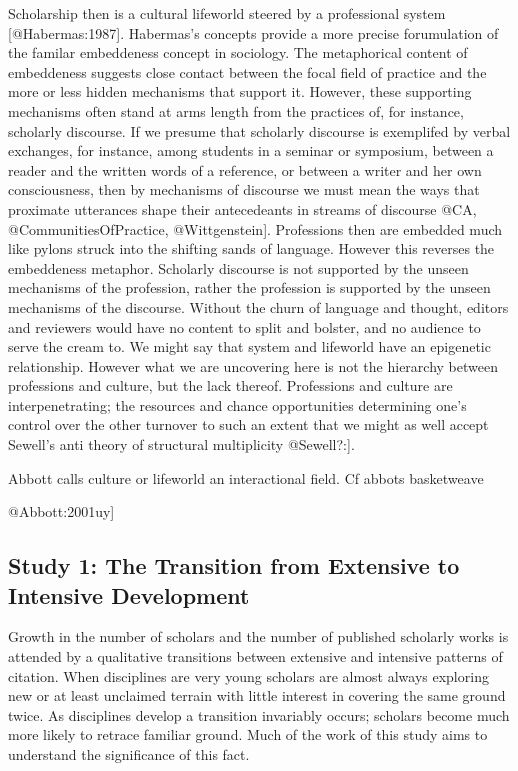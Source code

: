 \documentclass[]{article}
\begin{document}
Scholarship then is a cultural lifeworld steered by a professional
system {[}@Habermas:1987{]}. Habermas's concepts provide a more precise
forumulation of the familar embeddeness concept in sociology. The
metaphorical content of embeddeness suggests close contact between the
focal field of practice and the more or less hidden mechanisms that
support it. However, these supporting mechanisms often stand at arms
length from the practices of, for instance, scholarly discourse. If we
presume that scholarly discourse is exemplifed by verbal exchanges, for
instance, among students in a seminar or symposium, between a reader and
the written words of a reference, or between a writer and her own
consciousness, then by mechanisms of discourse we must mean the ways
that proximate utterances shape their antecedeants in streams of
discourse @CA, @CommunitiesOfPractice, @Wittgenstein{]}. Professions
then are embedded much like pylons struck into the shifting sands of
language. However this reverses the embeddeness metaphor. Scholarly
discourse is not supported by the unseen mechanisms of the profession,
rather the profession is supported by the unseen mechanisms of the
discourse. Without the churn of language and thought, editors and
reviewers would have no content to split and bolster, and no audience to
serve the cream to. We might say that system and lifeworld have an
epigenetic relationship. However what we are uncovering here is not the
hierarchy between professions and culture, but the lack thereof.
Professions and culture are interpenetrating; the resources and chance
opportunities determining one's control over the other turnover to such
an extent that we might as well accept Sewell's anti theory of
structural multiplicity @Sewell?:{]}.

Abbott calls culture or lifeworld an interactional field. Cf abbots
basketweave

@Abbott:2001uy{]}

\subsection{Study 1: The Transition from Extensive to Intensive
Development}\label{study-1-the-transition-from-extensive-to-intensive-development}

Growth in the number of scholars and the number of published scholarly
works is attended by a qualitative transitions between extensive and
intensive patterns of citation. When disciplines are very young scholars
are almost always exploring new or at least unclaimed terrain with
little interest in covering the same ground twice. As disciplines
develop a transition invariably occurs; scholars become much more likely
to retrace familiar ground. Much of the work of this study aims to
understand the significance of this fact.
\end{document}

